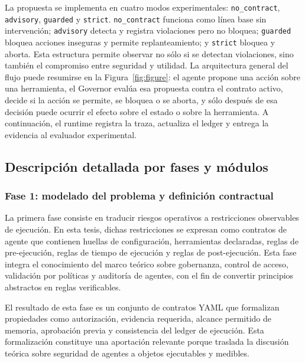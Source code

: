 La propuesta se implementa en cuatro modos experimentales: \texttt{no\_contract}, \texttt{advisory}, \texttt{guarded} y \texttt{strict}. \texttt{no\_contract} funciona como l\'inea base sin intervenci\'on; \texttt{advisory} detecta y registra violaciones pero no bloquea; \texttt{guarded} bloquea acciones inseguras y permite replanteamiento; y \texttt{strict} bloquea y aborta. Esta estructura permite observar no s\'olo si se detectan violaciones, sino tambi\'en el compromiso entre seguridad y utilidad. La arquitectura general del flujo puede resumirse en la Figura~\ref{fig:figure}: el agente propone una acci\'on sobre una herramienta, el Governor eval\'ua esa propuesta contra el contrato activo, decide si la acci\'on se permite, se bloquea o se aborta, y s\'olo despu\'es de esa decisi\'on puede ocurrir el efecto sobre el estado o sobre la herramienta. A continuaci\'on, el runtime registra la traza, actualiza el ledger y entrega la evidencia al evaluador experimental.

\subsection{Descripci\'on detallada por fases y m\'odulos}

\subsubsection{Fase 1: modelado del problema y definici\'on contractual}
La primera fase consiste en traducir riesgos operativos a restricciones observables de ejecuci\'on. En esta tesis, dichas restricciones se expresan como contratos de agente que contienen huellas de configuraci\'on, herramientas declaradas, reglas de pre-ejecuci\'on, reglas de tiempo de ejecuci\'on y reglas de post-ejecuci\'on. Esta fase integra el conocimiento del marco te\'orico sobre gobernanza, control de acceso, validaci\'on por pol\'iticas y auditor\'ia de agentes, con el fin de convertir principios abstractos en reglas verificables.

El resultado de esta fase es un conjunto de contratos YAML que formalizan propiedades como autorizaci\'on, evidencia requerida, alcance permitido de memoria, aprobaci\'on previa y consistencia del ledger de ejecuci\'on. Esta formalizaci\'on constituye una aportaci\'on relevante porque traslada la discusi\'on te\'orica sobre seguridad de agentes a objetos ejecutables y medibles.

